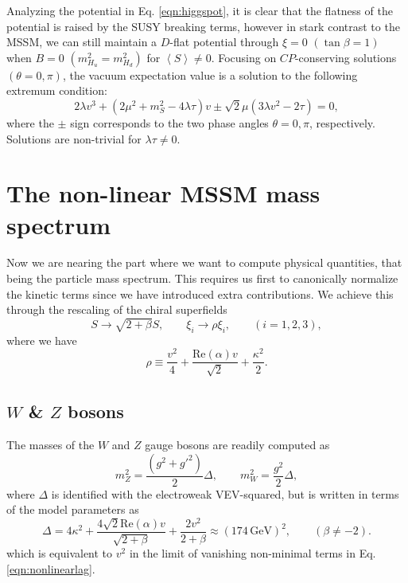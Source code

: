 Analyzing the potential in Eq. \ref{eqn:higgspot}, it is clear that the flatness of the potential is raised by the SUSY breaking terms, however in stark contrast to the MSSM, we can still maintain a $D$-flat potential through $\xi=0\,\, (\tan \beta=1)$ when $B=0\,\, (m^2_{H_u}=m^2_{H_d})$ for $\left\langle S \right\rangle \neq 0$. Focusing on $CP$-conserving solutions $(\theta=0,\pi)$, the vacuum expectation value is a solution to the following extremum condition:
\begin{equation}
2\lambda v^3 + (2\mu^2 + m^2_S - 4\lambda \tau)v \pm \sqrt{2}\mu (3\lambda v^2 - 2\tau)=0,
\end{equation}
where the $\pm$ sign corresponds to the two phase angles $\theta=0,\pi$, respectively. Solutions are non-trivial for $\lambda \tau \neq 0$.

\section{The non-linear MSSM mass spectrum}
\label{sec:EffMSSMmass}

Now we are nearing the part where we want to compute physical quantities, that being the particle mass spectrum. This requires us first to canonically normalize the kinetic terms since we have introduced extra contributions. We achieve this through the rescaling of the chiral superfields
\begin{equation}
S \rightarrow \sqrt{2+\beta}S, \qquad \xi_i \rightarrow \rho \xi_i, \qquad (i=1,2,3),
\end{equation}
where we have
\begin{equation}
\rho \equiv \frac{v^2}{4}+\frac{\text{Re}(\alpha)v}{\sqrt{2}}+\frac{\kappa^2}{2}.
\end{equation}

\subsection{$W$ \& $Z$ bosons}
The masses of the $W$ and $Z$ gauge bosons are readily computed as
\begin{equation}
m^2_Z = \frac{(g^2+g'^2)}{2} \Delta, \qquad m^2_W=\frac{g^2}{2} \Delta,
\end{equation}
where $\Delta$ is identified with the electroweak VEV-squared, but is written in terms of the model parameters as
\begin{equation}
\Delta = 4\kappa^2 + \frac{4\sqrt{2}\text{Re}(\alpha)v}{\sqrt{2+\beta}} + \frac{2v^2}{2+\beta} \approx (174\,\text{GeV})^2, \qquad (\beta \neq -2).
\end{equation}
which is equivalent to $v^2$ in the limit of vanishing non-minimal terms in Eq. \ref{eqn:nonlinearlag}.

